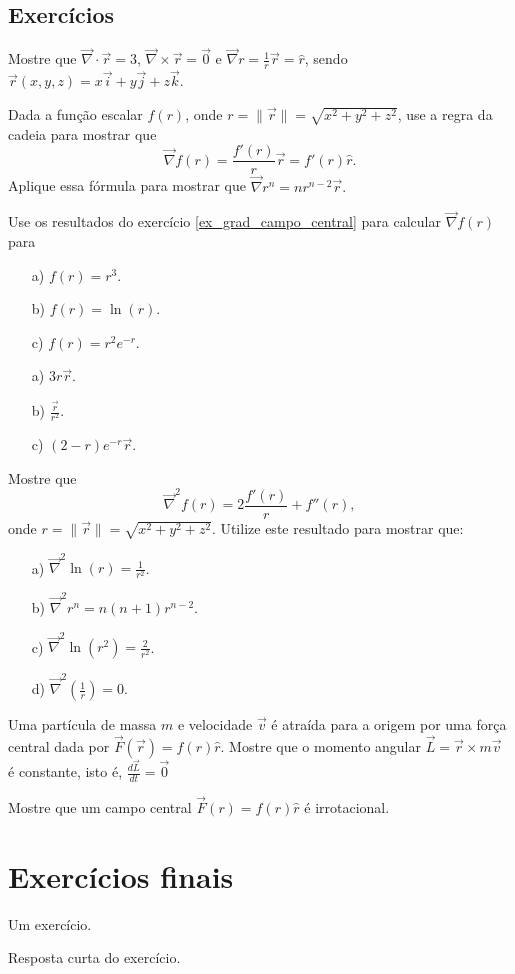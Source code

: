 \subsection*{Exercícios}
\begin{exer}
Mostre que $\vec{\nabla}\cdot\vec{r}=3$, $\vec{\nabla}\times\vec{r}=\vec{0}$ e $\vec{\nabla}r=\frac{1}{r}\vec{r}=\hat{r}$, sendo $\vec{r}(x,y,z)=x\vec{i}+y\vec{j}+z\vec{k}$.
\end{exer}
\begin{exer}\label{ex_grad_campo_central}
Dada a função escalar $f(r)$, onde $r=\|\vec{r}\|=\sqrt{x^2+y^2+z^2}$, use a regra da cadeia para mostrar que 
$$
\vec{\nabla}f(r)=\frac{f'(r)}{r}\vec{r}=f'(r)\hat{r}.
$$
Aplique essa fórmula para mostrar que $\vec{\nabla}r^n=nr^{n-2}\vec{r}.$
\end{exer}
\begin{exer}Use os resultados do exercício \ref{ex_grad_campo_central} para calcular $\vec{\nabla}f(r)$ para
\begin{itemize}
 \item[a)] $f(r)=r^3$.
 \item[b)] $f(r)=\ln(r)$.
 \item[c)] $f(r)=r^2e^{-r}$.
\end{itemize}
\end{exer}
\begin{resp}
\begin{itemize}
 \item[a)] $3r\vec{r}$.
 \item[b)] $\frac{\vec{r}}{r^2}$.
 \item[c)] $(2-r)e^{-r}\vec{r}$.
\end{itemize} 
\end{resp}
\begin{exer}
 Mostre que
 $$
 \vec{\nabla}^2f(r)=2\frac{f'(r)}{r}+f''(r),
 $$
 onde $r=\|\vec{r}\|=\sqrt{x^2+y^2+z^2}$. Utilize este resultado para mostrar que:
 \begin{itemize}
  \item[a)] $\vec{\nabla}^2\ln(r) =\frac{1}{r^2}$. 
  \item[b)] $\vec{\nabla}^2r^n =n(n+1)r^{n-2}$.
  \item[c)] $\vec{\nabla}^2\ln(r^2) =\frac{2}{r^2}$.
    \item[d)] $\vec{\nabla}^2\left(\frac{1}{r}\right) =0$.
 \end{itemize}
\end{exer}

\begin{exer}
 Uma partícula de massa $m$ e velocidade $\vec{v}$ é atraída para a origem por uma força central dada por $\vec{F}(\vec{r})=f(r)\hat{r}$. Mostre que o momento angular $\vec{L}=\vec{r}\times m\vec{v}$ é constante, isto é, $\frac{d\vec{L}}{dt}=\vec{0}$
\end{exer}
\begin{exer}
 Mostre que um campo central $\vec{F}(r)=f(r)\hat{r}$ é irrotacional.
\end{exer}


\section*{Exercícios finais}

\construirExer

\begin{exer}
  Um exercício.
\end{exer}
\begin{resp}
  Resposta curta do exercício.
\end{resp}
